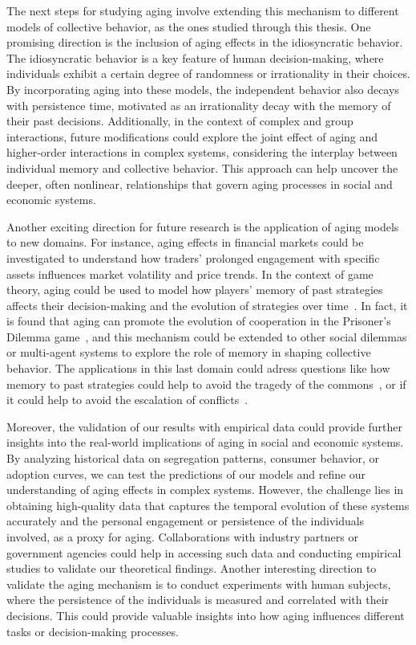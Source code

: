The next steps for studying aging involve extending this mechanism to different models of collective behavior, as the ones studied through this thesis. One promising direction is the inclusion of aging effects in the idiosyncratic behavior. The idiosyncratic behavior is a key feature of human decision-making, where individuals exhibit a certain degree of randomness or irrationality in their choices. By incorporating aging into these models, the independent behavior also decays with persistence time, motivated as an irrationality decay with the memory of their past decisions. Additionally, in the context of complex and group interactions, future modifications could explore the joint effect of aging and higher-order interactions in complex systems, considering the interplay between individual memory and collective behavior. This approach can help uncover the deeper, often nonlinear, relationships that govern aging processes in social and economic systems. 

Another exciting direction for future research is the application of aging models to new domains. For instance, aging effects in financial markets could be investigated to understand how traders' prolonged engagement with specific assets influences market volatility and price trends. In the context of game theory, aging could be used to model how players' memory of past strategies affects their decision-making and the evolution of strategies over time~\cite{samuele-ciardella-2023}. In fact, it is found that aging can promote the evolution of cooperation in the Prisoner's Dilemma game~\cite{attila-2009}, and this mechanism could be extended to other social dilemmas or multi-agent systems to explore the role of memory in shaping collective behavior. The applications in this last domain could adress questions like how memory to past strategies could help to avoid the tragedy of the commons~\cite{ostrom1990governing}, or if it could help to avoid the escalation of conflicts~\cite{axelrod1981evolution}.

Moreover, the validation of our results with empirical data could provide further insights into the real-world implications of aging in social and economic systems. By analyzing historical data on segregation patterns, consumer behavior, or adoption curves, we can test the predictions of our models and refine our understanding of aging effects in complex systems. However, the challenge lies in obtaining high-quality data that captures the temporal evolution of these systems accurately and the personal engagement or persistence of the individuals involved, as a proxy for aging. Collaborations with industry partners or government agencies could help in accessing such data and conducting empirical studies to validate our theoretical findings. Another interesting direction to validate the aging mechanism is to conduct experiments with human subjects, where the persistence of the individuals is measured and correlated with their decisions. This could provide valuable insights into how aging influences different tasks or decision-making processes.

